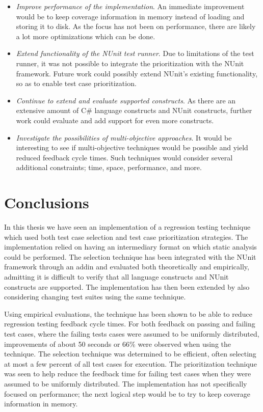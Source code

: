 \documentclass[a4paper,english,12pt]{report}
\let\Chapter\chapter
\def\chapter{\addtocontents{lol}{\protect\addvspace{10pt}}\Chapter}
\begin{document}
\begin{itemize}
  \item\textit{Improve performance of the implementation}. An immediate improvement would be to keep coverage information in memory instead of loading and storing it to disk. As the focus has not been on performance, there are likely a lot more optimizations which can be done.
  \item\textit{Extend functionality of the NUnit test runner}. Due to limitations of the test runner, it was not possible to integrate the prioritization with the NUnit framework. Future work could possibly extend NUnit's existing functionality, so as to enable test case prioritization.
  \item\textit{Continue to extend and evaluate supported constructs}. As there are an extensive amount of C\# language constructs and NUnit constructs, further work could evaluate and add support for even more constructs.
  \item\textit{Investigate the possibilities of multi-objective approaches}. It would be interesting to see if multi-objective techniques would be possible and yield reduced feedback cycle times. Such techniques would consider several additional constraints; time, space, performance, and more.
\end{itemize}

\chapter{Conclusions}\label{chap:conclusions}
In this thesis we have seen an implementation of a regression testing technique which used both test case selection and test case prioritization strategies. The implementation relied on having an intermediary format on which static analysis could be performed. The selection technique has been integrated with the NUnit framework through an addin and evaluated both theoretically and empirically, admitting it is difficult to verify that all language constructs and NUnit constructs are supported. The implementation has then been extended by also considering changing test suites using the same technique.

Using empirical evaluations, the technique has been shown to be able to reduce regression testing feedback cycle times. For both feedback on passing and failing test cases, where the failing tests cases were assumed to be uniformly distributed, improvements of about 50 seconds or 66\% were observed when using the technique. The selection technique was determined to be efficient, often selecting at most a few percent of all test cases for execution. The prioritization technique was seen to help reduce the feedback time for failing test cases when they were assumed to be uniformly distributed. The implementation has not specifically focused on performance; the next logical step would be to try to keep coverage information in memory.
\end{document}
